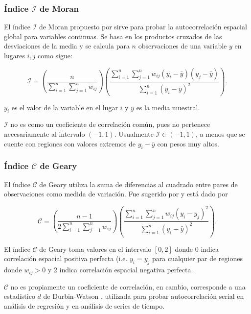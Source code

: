 \subsubsection{Índice $\mathcal{I}$ de Moran} 
El índice $\mathcal{I}$ de Moran propuesto por \citet{moran50} sirve para probar la autocorrelación espacial global para variables continuas. Se basa en los productos cruzados de las desviaciones de la media y se calcula para  $n$ observaciones de una variable $y$ en lugares $i,j$ como sigue:

\begin{equation}
\mathcal{I} = \left( \dfrac{n}{\displaystyle \sum_{i=1}^n \sum_{j=1}^n w_{ij}} \right) \left( \dfrac{\displaystyle \sum_{i=1}^n \sum_{j=1}^n w_{ij} (y_{i} - \bar{y}) (y_{j} - \bar{y}) }{\displaystyle \sum_{i=1}^n (y_{i} - \bar{y})^2} \right).
\end{equation}

$y_{i}$ es el valor de la variable en el lugar $i$ y $\overline{y}$ es la media muestral.

$\mathcal{I}$ no es como un coeficiente de correlación común, pues no pertenece necesariamente al intervalo $(-1,1)$. Usualmente $\mathcal{I} \in (-1,1)$, a menos que se cuente con regiones con valores extremos de $y_{i} - \overline{y}$ con pesos muy altos.


\subsubsection{Índice $\mathcal{C}$ de Geary} 
El índice $\mathcal{C}$ de Geary utiliza la suma de diferencias al cuadrado entre pares de observaciones como medida de variación. Fue sugerido por \citet{geary54} y está dado por

\begin{equation}
\mathcal{C} =  \left(\dfrac{n-1}{\displaystyle 2 \sum_{i=1}^n \sum_{j=1}^n w_{ij}}\right)  \left( \dfrac{\displaystyle \sum_{i=1}^n \sum_{j=1}^n w_{ij} (y_{i} - y_{j})^2}{\displaystyle \sum_{i=1}^n (y_{i} - \hat{y})^2}\right).
\end{equation}

El índice $\mathcal{C}$ de Geary toma valores en el intervalo $[0,2]$ donde 0 indica correlación espacial positiva perfecta (i.e. $y_{i}=y_{j}$ para cualquier par de regiones donde $w_{ij}>0$ y 2 indica correlación espacial negativa perfecta. 

$\mathcal{C}$ no es propiamente un coeficiente de correlación, en cambio, corresponde a una estadístico $d$ de Durbin-Watson \citep{clifford1981}, utilizada para probar autocorrelación serial en análisis de regresión y en análisis de series de tiempo.

